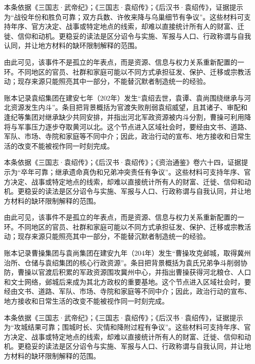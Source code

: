 本条依据《三国志·武帝纪》；《三国志·袁绍传》；《后汉书·袁绍传》，证据提示为“战役年份和胜负可靠；双方兵数、许攸来降与乌巢细节有争议”。这些材料可支持年序、官方决定、战事或特定地点的线索，却难以直接统计所有人的财富、迁徙、信仰和动机。更稳妥的读法是区分诏令与实施、军报与人口、行政称谓与自我认同，并让地方材料的缺环限制解释的范围。

由此可见，该事件不是孤立的年表点，而是资源、信息与权力关系重新配置的一环。不同地区的官员、社群和家庭可能以不同方式承担征发、保护、迁移或宗教活动；现存来源只能照亮其中一部分，不能替沉默者制造统一的经验。

账本记录袁绍集团在建安七年（202年）发生“袁绍去世，袁谭、袁尚围绕继承与河北资源发生内斗”。条目把背景概括为官渡失败削弱袁绍威望，且其诸子、审配和逢纪等集团对继承缺少共同安排，并指出河北军政资源被内斗分割，曹操可利用降将与军事压力逐步夺取黄河以北。这个节点进入区域社会时，要经由文书、道路、军队、市场、寺院和家庭等不同中介；因此，政治行动的宣布、地方接收和日常生活的改变不能被视作同一时刻完成。

本条依据《三国志·袁绍传》；《后汉书·袁绍传》；《资治通鉴》卷六十四，证据提示为“卒年可靠；继承遗命真伪和兄弟冲突责任有争议”。这些材料可支持年序、官方决定、战事或特定地点的线索，却难以直接统计所有人的财富、迁徙、信仰和动机。更稳妥的读法是区分诏令与实施、军报与人口、行政称谓与自我认同，并让地方材料的缺环限制解释的范围。

由此可见，该事件不是孤立的年表点，而是资源、信息与权力关系重新配置的一环。不同地区的官员、社群和家庭可能以不同方式承担征发、保护、迁移或宗教活动；现存来源只能照亮其中一部分，不能替沉默者制造统一的经验。

账本记录曹操集团与袁尚集团在建安九年（204年）发生“曹操攻克邺城，取得冀州治所、仓储与袁绍集团的核心行政资源”。条目把背景概括为袁氏兄弟争斗削弱协防，曹操以官渡后积累的军政资源围攻冀州中心，并指出曹操获得河北粮仓、人口和文士网络，邺城后来成为其北方政权的重要基地。这个节点进入区域社会时，要经由文书、道路、军队、市场、寺院和家庭等不同中介；因此，政治行动的宣布、地方接收和日常生活的改变不能被视作同一时刻完成。

本条依据《三国志·武帝纪》；《三国志·袁绍传》；《后汉书·袁绍传》，证据提示为“攻城结果可靠；围城时长、灾情和降附过程有争议”。这些材料可支持年序、官方决定、战事或特定地点的线索，却难以直接统计所有人的财富、迁徙、信仰和动机。更稳妥的读法是区分诏令与实施、军报与人口、行政称谓与自我认同，并让地方材料的缺环限制解释的范围。

